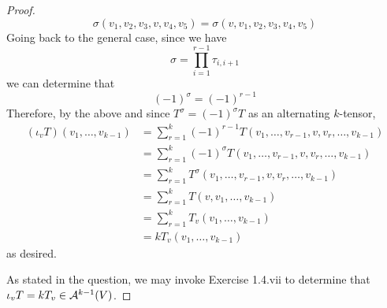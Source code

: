 \documentclass[../psets.tex]{subfiles}
\begin{document}
\begin{enumerate}[label={\textbf{1.7.\roman*.}}]
\begin{proof}
        \begin{equation*}
            \sigma(v_1,v_2,v_3,v,v_4,v_5) = \sigma(v,v_1,v_2,v_3,v_4,v_5)
        \end{equation*}
        Going back to the general case, since we have
        \begin{equation*}
            \sigma = \prod_{i=1}^{r-1}\tau_{i,i+1}
        \end{equation*}
        we can determine that
        \begin{equation*}
            (-1)^\sigma = (-1)^{r-1}
        \end{equation*}
        Therefore, by the above and since $T^\sigma=(-1)^\sigma T$ as an alternating $k$-tensor,
        \begin{align*}
            (\iota_vT)(v_1,\dots,v_{k-1}) &= \sum_{r=1}^k(-1)^{r-1}T(v_1,\dots,v_{r-1},v,v_r,\dots,v_{k-1})\\
            &= \sum_{r=1}^k(-1)^\sigma T(v_1,\dots,v_{r-1},v,v_r,\dots,v_{k-1})\\
            &= \sum_{r=1}^kT^\sigma(v_1,\dots,v_{r-1},v,v_r,\dots,v_{k-1})\\
            &= \sum_{r=1}^kT(v,v_1,\dots,v_{k-1})\\
            &= \sum_{r=1}^kT_v(v_1,\dots,v_{k-1})\\
            &= kT_v(v_1,\dots,v_{k-1})
        \end{align*}
        as desired.\par
        As stated in the question, we may invoke Exercise 1.4.vii to determine that $\iota_vT=kT_v\in\alt[k-1]{V}$.
    \end{proof}
\end{enumerate}
\end{document}
